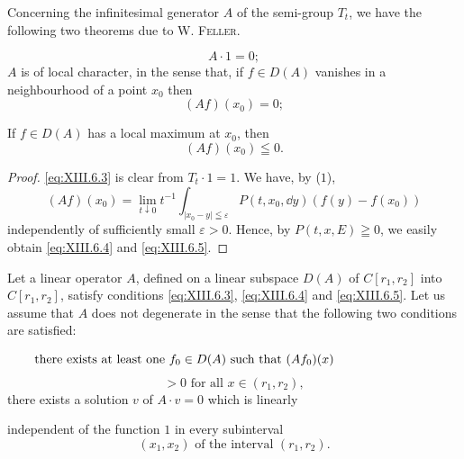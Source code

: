 Concerning the infinitesimal generator $A$ of the semi-group $T_{t}$, we have the following two theorems due to W. \textsc{Feller}. 

\begin{theorem}\label{thm:XIII.6.Theorem.1} 
\begin{equation}\label{eq:XIII.6.3}
A \cdot 1 = 0;
\end{equation}
$A$ is of local character, in the sense that, if $f \in D(A)$ 
vanishes in a neighbourhood of a point $x_0$ then 
\begin{equation}\label{eq:XIII.6.4}
(A f) (x _{0}) = 0;
\end{equation}
\end{theorem}

If $f \in D(A)$ has a local maximum at $x_0$, then 
\begin{equation}\label{eq:XIII.6.5}
(A f) (x _{0}) \leqq 0.
\end{equation}

\begin{proof}
 \eqref{eq:XIII.6.3} is clear from $T_{t} \cdot 1 = 1$. We have, by ($1$), 
\[
(A f) \left(x _{0}\right) = \lim\limits _{t \downarrow 0} t ^{-1} \int_ {\left| x _{0} - y \right| \leqq \varepsilon} P (t, x _{0}, \dd y) (f (y) - f \left(x _{0}\right))
\]
independently of sufficiently small $\varepsilon > 0$. Hence, by $P(t, x, E) \geqq 0$, we easily obtain \eqref{eq:XIII.6.4} and \eqref{eq:XIII.6.5}. 
\end{proof}

\begin{theorem}\label{thm:XIII.6.Theorem.2} Let a linear operator $A$, defined on a linear subspace $D(A)$ of $C[r_{1}, r_{2}]$ into $C[r_{1}, r_{2}]$, satisfy conditions \eqref{eq:XIII.6.3}, \eqref{eq:XIII.6.4} and \eqref{eq:XIII.6.5}. Let us assume that $A$ does not degenerate in the sense that the following two conditions are satisfied: 

\begin{equation}
\label{eq:XIII.6.6}
\begin{minipage}{0.92\linewidth}
\everymath{}\let\limits\nolimits
there exists at least one $f_0 \in D(A)$ such that $(Af_0)(x)$
\end{minipage}
\end{equation}
\begin{equation}\label{eq:XIII.6.7}
> 0 \text{ for all } x \in (r _{1}, r _{2}),
\end{equation}
there exists a solution $v$ of $A \cdot v = 0$ which is linearly 


independent of the function $1$ in every subinterval 
\[
\left(x _{1}, x _{2}\right) \text{ of the interval } \left(r _{1}, r _{2}\right).
\]
\end{theorem}

